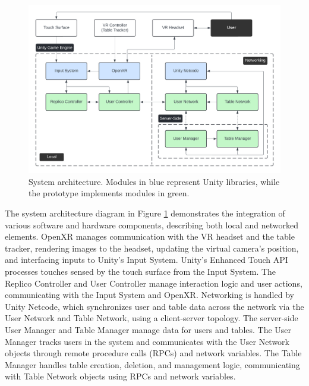    \begin{figure}[h]
        \centering
        \includegraphics[width=.97\linewidth]{figures/architecture.png}
        \caption{System architecture. Modules in blue represent Unity libraries, while the prototype implements modules in green.}
        \label{fig:architecture}
    \end{figure}
    
    The system architecture diagram in Figure \ref{fig:architecture} demonstrates the integration of various software and hardware components, describing both local and networked elements. OpenXR manages communication with the VR headset and the table tracker, rendering images to the headset, updating the virtual camera's position, and interfacing inputs to Unity's Input System. Unity's Enhanced Touch API processes touches sensed by the touch surface from the Input System. The Replico Controller and User Controller manage interaction logic and user actions, communicating with the Input System and OpenXR. Networking is handled by Unity Netcode, which synchronizes user and table data across the network via the User Network and Table Network, using a client-server topology. The server-side User Manager and Table Manager manage data for users and tables. The User Manager tracks users in the system and communicates with the User Network objects through remote procedure calls (RPCs) and network variables. The Table Manager handles table creation, deletion, and management logic, communicating with Table Network objects using RPCs and network variables.




